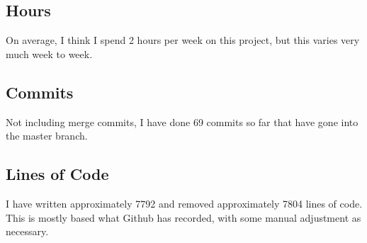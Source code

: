 \documentclass[12 pt]{article}
\begin{document}
\subsection{Hours}

On average, I think I spend 2 hours per week on this project, but this varies
very much week to week.

\subsection{Commits}

Not including merge commits, I have done 69 commits so far that have gone into
the master branch.

\subsection{Lines of Code}

I have written approximately 7792 and removed approximately 7804 lines of code.
This is mostly based what Github has recorded, with some manual adjustment as
necessary.
\end{document}
